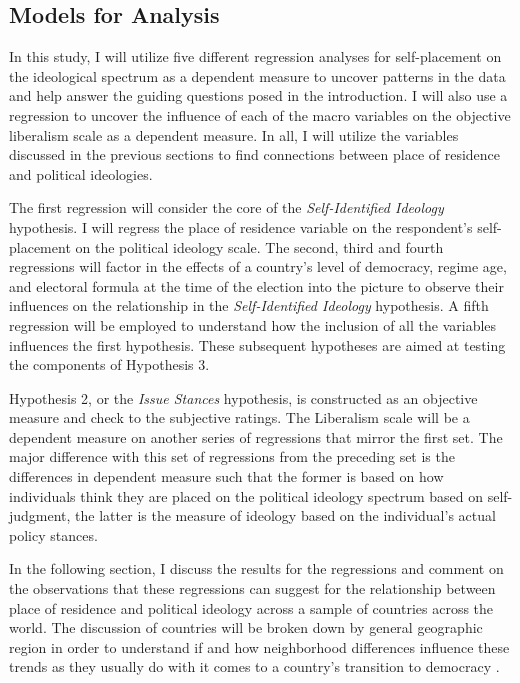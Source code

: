 \documentclass[12pt, titlepage]{article}
\newcommand\e{\emph}
\begin{document}
\subsection{Models for Analysis}

In this study, I will utilize five different regression analyses for self-placement on the ideological spectrum as a dependent measure to uncover patterns in the data and help answer the guiding questions posed in the introduction. I will also use a regression to uncover the influence of each of the macro variables on the objective liberalism scale as a dependent measure. In all, I will utilize the variables discussed in the previous sections to find connections between place of residence and political ideologies.

The first regression will consider the core of the \e{Self-Identified Ideology} hypothesis. I will regress the place of residence variable on the respondent's self-placement on the political ideology scale. The second, third and fourth regressions will factor in the effects of a country's level of democracy, regime age, and electoral formula at the time of the election into the picture to observe their influences on the relationship in the \e{Self-Identified Ideology} hypothesis. A fifth regression will be employed to understand how the inclusion of all the variables influences the first hypothesis. These subsequent hypotheses are aimed at testing the components of Hypothesis 3.

Hypothesis 2, or the \e{Issue Stances} hypothesis, is constructed as an objective measure and check to the subjective ratings. The Liberalism scale will be a dependent measure on another series of regressions that mirror the first set. The major difference with this set of regressions from the preceding set is the differences in dependent measure such that the former is based on how individuals think they are placed on the political ideology spectrum based on self-judgment, the latter is the measure of ideology based on the individual's actual policy stances.

In the following section, I discuss the results for the regressions and comment on the observations that these regressions can suggest for the relationship between place of residence and political ideology across a sample of countries across the world. The discussion of countries will be broken down by general geographic region in order to understand if and how neighborhood differences influence these trends as they usually do with it comes to a country's transition to democracy \citep{brinks2006diffusion}.
\end{document}
